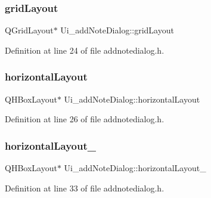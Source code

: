 \hypertarget{classUi__addNoteDialog_a8e3a587de2697e28e5c06232ae12a27f}{}\label{classUi__addNoteDialog_a8e3a587de2697e28e5c06232ae12a27f} 
\subsubsection{\texorpdfstring{grid\+Layout}{gridLayout}}
{\footnotesize\ttfamily Q\+Grid\+Layout$\ast$ Ui\+\_\+add\+Note\+Dialog\+::grid\+Layout}



Definition at line 24 of file addnotedialog.\+h.

\hypertarget{classUi__addNoteDialog_aee7483b969d780e610d025a38849298c}{}\label{classUi__addNoteDialog_aee7483b969d780e610d025a38849298c} 
\subsubsection{\texorpdfstring{horizontal\+Layout}{horizontalLayout}}
{\footnotesize\ttfamily Q\+H\+Box\+Layout$\ast$ Ui\+\_\+add\+Note\+Dialog\+::horizontal\+Layout}



Definition at line 26 of file addnotedialog.\+h.

\hypertarget{classUi__addNoteDialog_a887453602e2364b3972cf6b0512210c9}{}\label{classUi__addNoteDialog_a887453602e2364b3972cf6b0512210c9} 
\subsubsection{\texorpdfstring{horizontal\+Layout\+\_}{horizontalLayout\_5}}
{\footnotesize\ttfamily Q\+H\+Box\+Layout$\ast$ Ui\+\_\+add\+Note\+Dialog\+::horizontal\+Layout\+\_}



Definition at line 33 of file addnotedialog.\+h.

\hypertarget{classUi__addNoteDialog_a5c9351b134e471dcf8256461f2e5edb3}{}\label{classUi__addNoteDialog_a5c9351b134e471dcf8256461f2e5edb3} 
